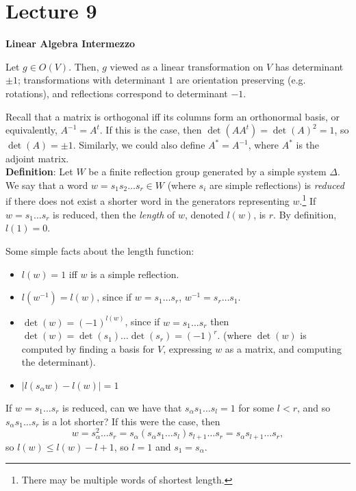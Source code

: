 \section{Lecture 9}

{\bf Linear Algebra Intermezzo}

Let $g \in O(V)$. Then, $g$ viewed as a linear transformation on $V$ has
determinant $\pm 1$; transformations with determinant $1$ are orientation
preserving (e.g. rotations), and reflections correspond to determinant $-1$.

Recall that a matrix is orthogonal iff its columns form an orthonormal basis,
or equivalently, $A^{-1} = A^t$. If this is the case, then
$\det(A A^t) = \det(A)^2 = 1$, so $\det(A) = \pm 1$. Similarly, we could also
define $A^* = A^{-1}$, where $A^*$ is the adjoint matrix.
\\

\noindent
{\bf Definition}:
Let $W$ be a finite reflection group generated by a simple system $\Delta$. We
say that a word $w = s_1 s_2 \dots s_r \in W$ (where $s_i$ are simple reflections)
is {\em reduced} if there does not exist a shorter word in the generators
representing $w$.\footnote{There may be multiple words of shortest length.}
If $w = s_1 \dots s_r$ is reduced, then the {\em length} of $w$, denoted $l(w)$,
is $r$.
By definition, $l(1) = 0$.


Some simple facts about the length function:
\begin{itemize}
\item $l(w) = 1$ iff $w$ is a simple reflection.
\item $l(w^{-1}) = l(w)$, since if $w = s_1 \dots s_r$, $w^{-1} = s_r \dots s_1$.
\item $\det(w) = (-1)^{l(w)}$, since if $w = s_1 \dots s_r$ then $\det(w)
= \det(s_1) \dots \det(s_r) = (-1)^r$.
(where $\det(w)$ is computed by finding a basis for $V$, expressing $w$ as a
matrix, and computing the determinant).
\item $| l(s_\alpha w) - l(w) | = 1$ %
\end{itemize}

If $w = s_1 \dots s_r$ is reduced, can we have that
$s_\alpha s_1 \dots s_l = 1$ for some $l < r$, and so
$s_\alpha s_1 \dots s_r$ is a lot shorter?
If this were the case, then
\[
w = s_\alpha^2 \dots s_r = s_\alpha (s_\alpha s_1 \dots s_l)
s_{l+1} \dots s_r = s_\alpha s_{l+1} \dots s_r,
\]
so $l(w) \leq l(w)-l+1$, so $l = 1$ and $s_1 = s_\alpha$.
\\

